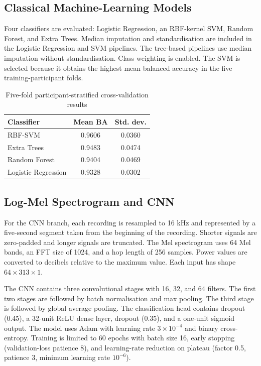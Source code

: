 \documentclass[conference]{IEEEtran}
\begin{document}
\subsection{Classical Machine-Learning Models}
Four classifiers are evaluated: Logistic Regression, an RBF-kernel SVM, Random Forest, and Extra Trees. Median imputation and standardisation are included in the Logistic Regression and SVM pipelines. The tree-based pipelines use median imputation without standardisation. Class weighting is enabled. The SVM is selected because it obtains the highest mean balanced accuracy in the five training-participant folds.

\begin{table}[!t]
\centering
\caption{Five-fold participant-stratified cross-validation results}
\label{tab:cv}
\begin{tabular}{lcc}
\toprule
Classifier & Mean BA & Std. dev.\\
\midrule
RBF-SVM & 0.9606 & 0.0360\\
Extra Trees & 0.9483 & 0.0474\\
Random Forest & 0.9404 & 0.0469\\
Logistic Regression & 0.9328 & 0.0302\\
\bottomrule
\end{tabular}
\end{table}

\subsection{Log-Mel Spectrogram and CNN}
For the CNN branch, each recording is resampled to 16 kHz and represented by a five-second segment taken from the beginning of the recording. Shorter signals are zero-padded and longer signals are truncated. The Mel spectrogram uses 64 Mel bands, an FFT size of 1024, and a hop length of 256 samples. Power values are converted to decibels relative to the maximum value. Each input has shape $64\times313\times1$.

The CNN contains three convolutional stages with 16, 32, and 64 filters. The first two stages are followed by batch normalisation and max pooling. The third stage is followed by global average pooling. The classification head contains dropout (0.45), a 32-unit ReLU dense layer, dropout (0.35), and a one-unit sigmoid output. The model uses Adam with learning rate $3\times10^{-4}$ and binary cross-entropy. Training is limited to 60 epochs with batch size 16, early stopping (validation-loss patience 8), and learning-rate reduction on plateau (factor 0.5, patience 3, minimum learning rate $10^{-6}$).
\end{document}
